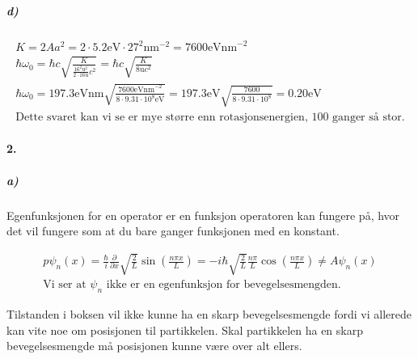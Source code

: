 \documentclass[11pt, A4paper,norsk]{article}
\begin{document}
			\subparagraph{d)}
				\begin{gather*}
K = 2 A a^2 = 2 \cdot 5.2 \text{eV} \cdot 27^2 \text{nm}^{-2} = 7600 \text{eVnm}^{-2} \\
\hbar \omega_0 = \hbar c \sqrt{\frac{K}{\frac{16^2 \text{u}^2}{2 \cdot 16 \text{u}} c^2}} = \hbar c \sqrt{\frac{K}{8 \text{u} c^2}} \\
\hbar \omega_0 = 197.3 \text{eVnm} \sqrt{\frac{7600 \text{eVnm}^{-2}}{8 \cdot 9.31 \cdot 10^{8} \text{eV}}} = 197.3 \text{eV} \sqrt{\frac{7600}{8 \cdot 9.31 \cdot 10^{8}}} = 0.20 \text{eV} \\
\text{Dette svaret kan vi se er mye større enn rotasjonsenergien, $100$ ganger så stor.}
				\end{gather*}











		\paragraph{2.}
			\subparagraph{a)}
				\begin{flushleft}
Egenfunksjonen for en operator er en funksjon operatoren kan fungere på, hvor det vil fungere som at du bare ganger funksjonen med en konstant.
				\end{flushleft}
				\begin{gather*}
p \psi_n(x) = \frac{\hbar}{i} \frac{\partial}{\partial x} \sqrt{\frac{2}{L}} \sin\left( \frac{n \pi x}{L} \right) = - i \hbar \sqrt{\frac{2}{L}} \frac{n \pi}{L} \cos\left( \frac{n \pi x}{L} \right) \neq A \psi_n(x) \\
\text{Vi ser at $\psi_n$ ikke er en egenfunksjon for bevegelsesmengden.}
				\end{gather*}
				\begin{flushleft}
Tilstanden i boksen vil ikke kunne ha en skarp bevegelsesmengde fordi vi allerede kan vite noe om posisjonen til partikkelen. Skal partikkelen ha en skarp bevegelsesmengde må posisjonen kunne være over alt ellers.
				\end{flushleft}
\end{document}
